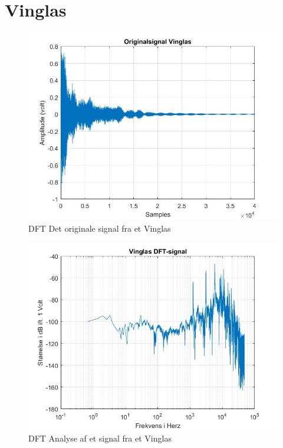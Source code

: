 \section{Vinglas}
\begin{figure}[H]
	\centering
	\includegraphics[width=180mm]{figures/Vinglas/original.jpg}
	\caption{DFT Det originale signal fra et Vinglas}
	\label{fig:Vinglas original}
\end{figure}

\begin{figure}[H]
	\centering
	\includegraphics[width=180mm]{figures/Vinglas/DFT.jpg}
	\caption{DFT Analyse af et signal fra et Vinglas}
	\label{fig:Vinglas DFT}
\end{figure}

